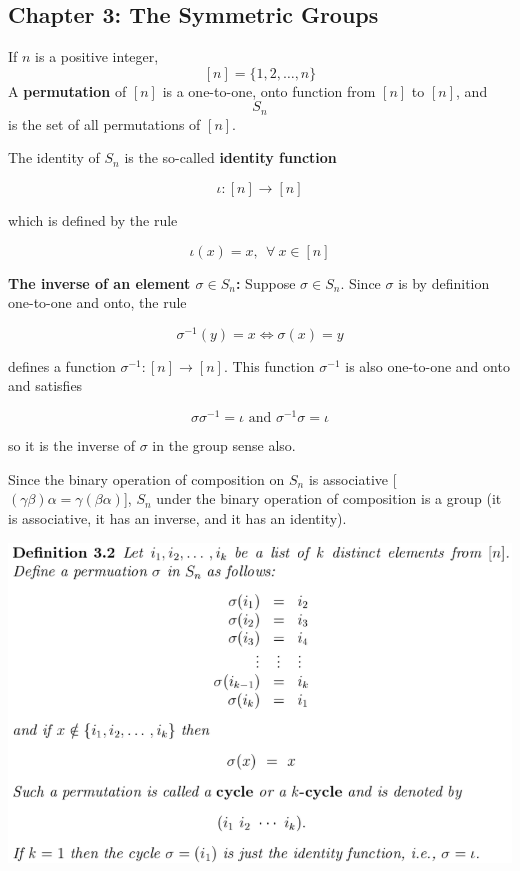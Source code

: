 \documentclass{article}
\begin{document}
\pagebreak
\subsection{Chapter 3: The Symmetric Groups}

If \(n\) is a positive integer, \[[n] = \{ 1, 2, \ldots, n \} \] A \textbf{permutation} of \([n]\) is a one-to-one, onto function from \([n]\) to \([n]\), and \[S_n\] is the set of all permutations of \([n]\).

The identity of \(S_n\) is the so-called \textbf{identity function}

\[
\iota : [n] \to [n]
\]

which is defined by the rule

\[
\iota(x) = x, \ \ \forall \ x \in [n]
\]

\textbf{The inverse of an element \(\sigma \in S_n\):} Suppose \(\sigma \in S_n\). Since \(\sigma\) is by definition one-to-one and onto, the rule

\[
\sigma^{-1}(y) = x \iff \sigma(x) = y
\]

defines a function \(\sigma^{-1}: [n] \to [n]\). This function \(\sigma^{-1}\) is also one-to-one and onto and satisfies

\[
\sigma \sigma^{-1} = \iota \text{       and         } \sigma^{-1}\sigma = \iota
\]

so it is the inverse of \(\sigma\) in the group sense also.

Since the binary operation of composition on \(S_n\) is associative [\(  (\gamma \beta) \alpha = \gamma (\beta \alpha)  \)], \(S_n\) under the binary operation of composition is a group (it is associative, it has an inverse, and it has an identity).

\includegraphics[scale=0.45]{cycle}
\end{document}
